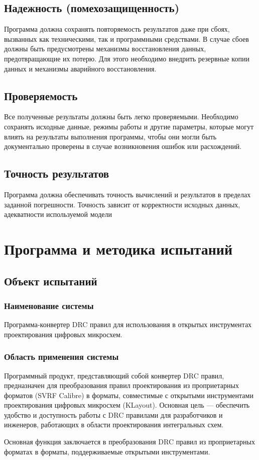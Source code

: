 \subsection{Надежность (помехозащищенность)}
Программа должна сохранять повторяемость результатов даже при сбоях, вызванных как техническими, так и программными средствами. В случае сбоев должны быть предусмотрены механизмы восстановления данных, предотвращающие их потерю. Для этого необходимо внедрить резервные копии данных и механизмы аварийного восстановления.

\subsection{Проверяемость}
Все полученные результаты должны быть легко проверяемыми. Необходимо сохранять исходные данные, режимы работы и другие параметры, которые могут влиять на результаты выполнения программы, чтобы они могли быть документально проверены в случае возникновения ошибок или расхождений.

\subsection{Точность результатов}
Программа должна обеспечивать точность вычислений и результатов в пределах заданной погрешности. Точность зависит от корректности исходных данных, адекватности используемой модели

\section{Программа и методика испытаний}

\subsection{Объект испытаний}

\subsubsection{Наименование системы}

Программа-конвертер DRC правил для использования
в открытых инструментах проектирования цифровых микросхем.

\subsubsection{Область применения системы}

Программный продукт, представляющий собой конвертер DRC правил,
предназначен для преобразования правил проектирования
из проприетарных форматов (SVRF Calibre) в форматы, совместимые
с открытыми инструментами проектирования цифровых микросхем (KLayout).
Основная цель --- обеспечить удобство
и доступность работы с DRC правилами для разработчиков и инженеров,
работающих в области проектирования интегральных схем.\par
Основная функция заключается в преобразования DRC правил
из проприетарных форматах в форматы,
поддерживаемые открытыми инструментами.

